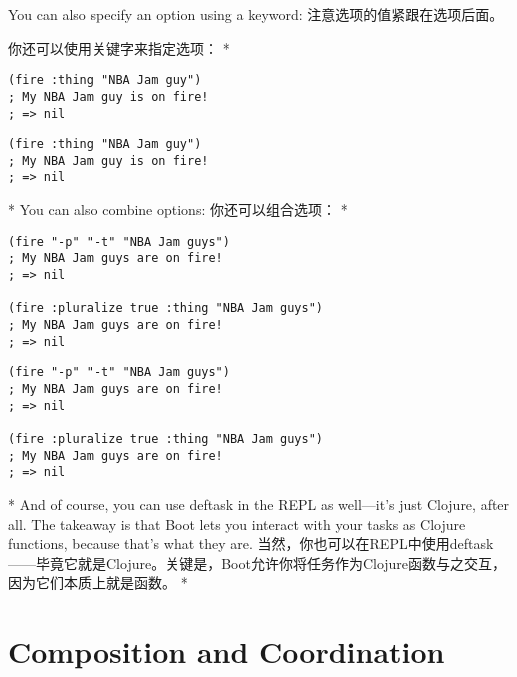 \begin{paracol}{2}
You can also specify an option using a keyword:
\switchcolumn
注意选项的值紧跟在选项后面。

你还可以使用关键字来指定选项：
\switchcolumn[0]*
\begin{verbatim}
(fire :thing "NBA Jam guy")
; My NBA Jam guy is on fire!
; => nil
\end{verbatim}
\switchcolumn
\begin{verbatim}
(fire :thing "NBA Jam guy")
; My NBA Jam guy is on fire!
; => nil
\end{verbatim}
\switchcolumn[0]*
You can also combine options:
\switchcolumn
你还可以组合选项：
\switchcolumn[0]*
\begin{verbatim}
(fire "-p" "-t" "NBA Jam guys")
; My NBA Jam guys are on fire!
; => nil

(fire :pluralize true :thing "NBA Jam guys")
; My NBA Jam guys are on fire!
; => nil
\end{verbatim}
\switchcolumn
\begin{verbatim}
(fire "-p" "-t" "NBA Jam guys")
; My NBA Jam guys are on fire!
; => nil

(fire :pluralize true :thing "NBA Jam guys")
; My NBA Jam guys are on fire!
; => nil
\end{verbatim}
\switchcolumn[0]*
And of course, you can use deftask in the REPL as well---it's just
Clojure, after all. The takeaway is that Boot lets you interact with
your tasks as Clojure functions, because that's what they are.
\switchcolumn
当然，你也可以在REPL中使用deftask——毕竟它就是Clojure。关键是，Boot允许你将任务作为Clojure函数与之交互，因为它们本质上就是函数。
\switchcolumn[0]*
\section{Composition and Coordination}
\switchcolumn

\end{paracol}
